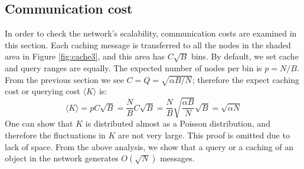 \documentclass[conference]{IEEEtran}
\begin{document}
\subsection{Communication cost}
In order to check the network's scalability, communication costs
are examined in this section. Each caching message is transferred to all the
nodes in the shaded area in Figure \ref{fig:cache3}, and this area has
$C\sqrt{B}$ bins. By default, we set cache and query ranges are equally.
The expected number of nodes per bin is $p=N/B$.
From the previous section we see
$C = Q = \sqrt{\alpha B/N}$; therefore the expect caching cost or querying
cost $\langle K\rangle$ is:
\begin{equation*}\label{th}
\langle K\rangle = pC\sqrt{B} = \frac{N}{B}C\sqrt{B} = \frac{N}{B}\sqrt{\frac{\alpha B}{N}}\sqrt{B}
= \sqrt{\alpha N}
\end{equation*}
One can show that $K$ is distributed almost as a Poisson distribution, and
therefore the fluctuations in $K$ are not very large.  This proof is omitted
due to lack of space.
From the above analysis, we show that a query or a caching of an object in the network
generates $O(\sqrt{N})$ messages.
\end{document}
